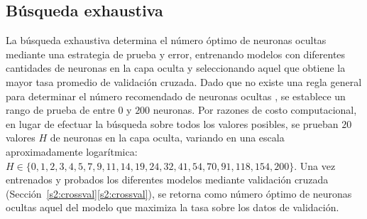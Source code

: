 %
\subsection{Búsqueda exhaustiva}
%
La búsqueda exhaustiva determina el número óptimo de neuronas ocultas
mediante una estrategia de prueba y error, entrenando modelos con
diferentes cantidades de neuronas en la capa oculta y seleccionando
aquel que obtiene la mayor tasa \GM{} promedio de validación cruzada.
Dado que no existe una regla general para determinar el número
recomendado de neuronas ocultas \cite{nnfaq3}, se establece un rango
de prueba de entre $0$ y $200$ neuronas.
Por razones de costo computacional, en lugar de efectuar la búsqueda
sobre todos los valores posibles, se prueban $20$ valores $H$ de
neuronas en la capa oculta, variando en una escala aproximadamente
logarítmica: $H\in\{0,1,2,3,4,5,7,9,11,14,19,24,32,41,54,70,91,118,154,200\}$.
Una vez entrenados y probados los diferentes modelos mediante validación
cruzada (\iflatexml{}Sección~\ref{s2:crossval}\else\autoref{s2:crossval}\fi{}),
se retorna como número óptimo de neuronas ocultas aquel del modelo que
maximiza la tasa \GM{} sobre los datos de validación.
